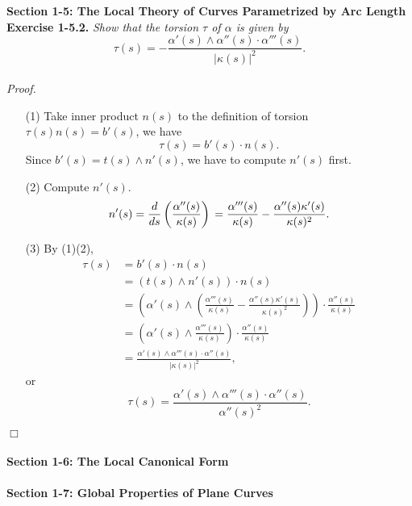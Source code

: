 \documentclass{article}
\begin{document}
\textbf{\large Section 1-5: The Local Theory of Curves Parametrized by Arc Length} \\

\textbf{Exercise 1-5.2.}
\emph{Show that the torsion $\tau$ of $\alpha$ is given by
$$\tau(s) = -\frac{\alpha'(s) \wedge \alpha''(s) \cdot \alpha'''(s)}{|\kappa(s)|^2}.$$} \\

\emph{Proof.}
\begin{enumerate}
\item[(1)]
Take inner product $n(s)$
to the definition of torsion $\tau(s) n(s) = b'(s)$,
we have $$\tau(s) = b'(s) \cdot n(s).$$
Since $b'(s) = t(s) \wedge n'(s)$, we have to compute $n'(s)$ first.
\item[(2)]
Compute $n'(s)$.
$$n'(s)
= \frac{d}{ds} \left( \frac{\alpha''(s)}{\kappa(s)} \right) \\
= \frac{\alpha'''(s)}{\kappa(s)} - \frac{\alpha''(s)\kappa'(s)}{\kappa(s)^2}.$$
\item[(3)]
By (1)(2),
\begin{align*}
\tau(s)
&= b'(s) \cdot n(s) \\
&= (t(s) \wedge n'(s)) \cdot n(s) \\
&= \left(
  \alpha'(s)
    \wedge
  \left(
    \frac{\alpha'''(s)}{\kappa(s)}
    - \frac{\alpha''(s)\kappa'(s)}{\kappa(s)^2}
  \right)
\right)
\cdot \frac{\alpha''(s)}{\kappa(s)} \\
&= \left(
  \alpha'(s) \wedge \frac{\alpha'''(s)}{\kappa(s)}
\right)
\cdot \frac{\alpha''(s)}{\kappa(s)} \\
&= \frac{\alpha'(s) \wedge \alpha'''(s) \cdot \alpha''(s)}{|\kappa(s)|^2},
\end{align*}
or
$$\tau(s) = \frac{\alpha'(s) \wedge \alpha'''(s) \cdot \alpha''(s)}{\alpha''(s)^2}.$$

\end{enumerate}
$\Box$ \\\\






\textbf{\large Section 1-6: The Local Canonical Form} \\\\






\textbf{\large Section 1-7: Global Properties of Plane Curves} \\\\



\end{document}
